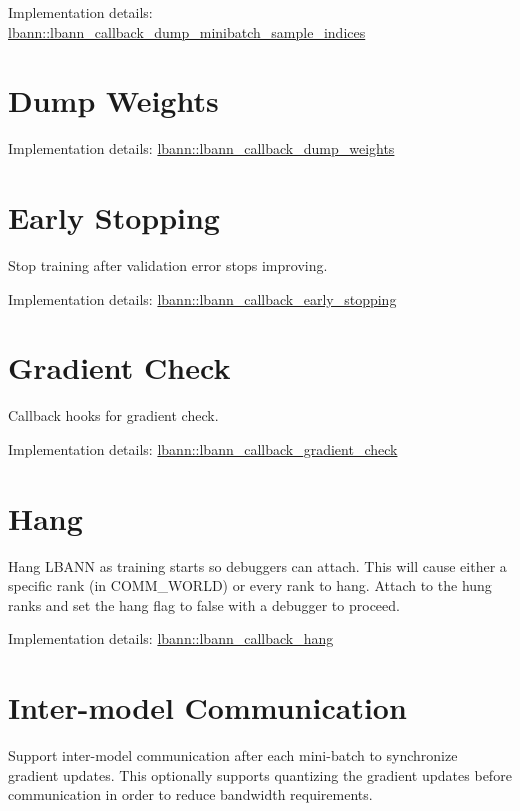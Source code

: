 Implementation details\+: \hyperlink{classlbann_1_1lbann__callback__dump__minibatch__sample__indices}{lbann\+::lbann\+\_\+callback\+\_\+dump\+\_\+minibatch\+\_\+sample\+\_\+indices}\hypertarget{callbacks_dump_wei}{}\section{Dump Weights}\label{callbacks_dump_wei}
Implementation details\+: \hyperlink{classlbann_1_1lbann__callback__dump__weights}{lbann\+::lbann\+\_\+callback\+\_\+dump\+\_\+weights}\hypertarget{callbacks_earlystop}{}\section{Early Stopping}\label{callbacks_earlystop}
Stop training after validation error stops improving.

Implementation details\+: \hyperlink{classlbann_1_1lbann__callback__early__stopping}{lbann\+::lbann\+\_\+callback\+\_\+early\+\_\+stopping}\hypertarget{callbacks_gradientcheck}{}\section{Gradient Check}\label{callbacks_gradientcheck}
Callback hooks for gradient check.

Implementation details\+: \hyperlink{classlbann_1_1lbann__callback__gradient__check}{lbann\+::lbann\+\_\+callback\+\_\+gradient\+\_\+check}\hypertarget{callbacks_hang}{}\section{Hang}\label{callbacks_hang}
Hang L\+B\+A\+NN as training starts so debuggers can attach. This will cause either a specific rank (in C\+O\+M\+M\+\_\+\+W\+O\+R\+LD) or every rank to hang. Attach to the hung ranks and set the hang flag to false with a debugger to proceed.

Implementation details\+: \hyperlink{classlbann_1_1lbann__callback__hang}{lbann\+::lbann\+\_\+callback\+\_\+hang}\hypertarget{callbacks_im_comm}{}\section{Inter-\/model Communication}\label{callbacks_im_comm}
Support inter-\/model communication after each mini-\/batch to synchronize gradient updates. This optionally supports quantizing the gradient updates before communication in order to reduce bandwidth requirements.

